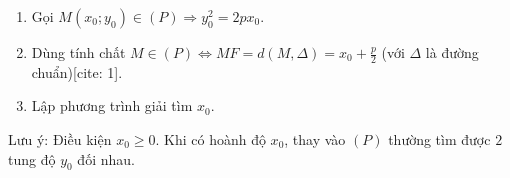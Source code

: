 \begin{enumerate}
\item Gọi $M(x_0; y_0) \in (P) \Rightarrow y_0^2 = 2px_0$.
\item Dùng tính chất $M \in (P) \Leftrightarrow MF = d(M, \Delta) = x_0 + \frac{p}{2}$ (với $\Delta$ là đường chuẩn)[cite: 1].
\item Lập phương trình giải tìm $x_0$.
\end{enumerate}
Lưu ý: Điều kiện $x_0 \ge 0$. Khi có hoành độ $x_0$, thay vào $(P)$ thường tìm được $2$ tung độ $y_0$ đối nhau.
